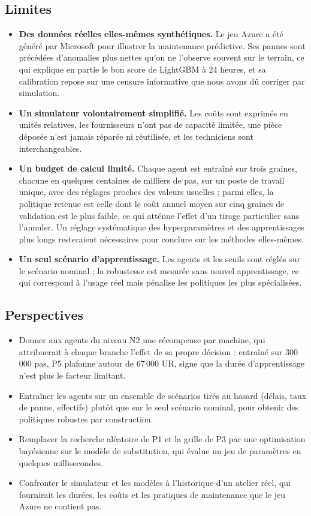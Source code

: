 \subsection{Limites}

\begin{itemize}
\item \textbf{Des données réelles elles-mêmes synthétiques.} Le jeu Azure a été généré par Microsoft pour illustrer la maintenance prédictive. Ses pannes sont précédées d'anomalies plus nettes qu'on ne l'observe souvent sur le terrain, ce qui explique en partie le bon score de LightGBM à 24 heures, et sa calibration repose sur une censure informative que nous avons dû corriger par simulation.
\item \textbf{Un simulateur volontairement simplifié.} Les coûts sont exprimés en unités relatives, les fournisseurs n'ont pas de capacité limitée, une pièce déposée n'est jamais réparée ni réutilisée, et les techniciens sont interchangeables.
\item \textbf{Un budget de calcul limité.} Chaque agent est entraîné sur trois graines, chacune en quelques centaines de milliers de pas, sur un poste de travail unique, avec des réglages proches des valeurs usuelles ; parmi elles, la politique retenue est celle dont le coût annuel moyen sur cinq graines de validation est le plus faible, ce qui atténue l'effet d'un tirage particulier sans l'annuler. Un réglage systématique des hyperparamètres et des apprentissages plus longs resteraient nécessaires pour conclure sur les méthodes elles-mêmes.
\item \textbf{Un seul scénario d'apprentissage.} Les agents et les seuils sont réglés sur le scénario nominal ; la robustesse est mesurée sans nouvel apprentissage, ce qui correspond à l'usage réel mais pénalise les politiques les plus spécialisées.
\end{itemize}

\subsection{Perspectives}

\begin{itemize}
\item Donner aux agents du niveau N2 une récompense par machine, qui attribuerait à chaque branche l'effet de sa propre décision : entraîné sur 300\,000 pas, P5 plafonne autour de 67\,000 UR, signe que la durée d'apprentissage n'est plus le facteur limitant.
\item Entraîner les agents sur un ensemble de scénarios tirés au hasard (délais, taux de panne, effectifs) plutôt que sur le seul scénario nominal, pour obtenir des politiques robustes par construction.
\item Remplacer la recherche aléatoire de P1 et la grille de P3 par une optimisation bayésienne sur le modèle de substitution, qui évalue un jeu de paramètres en quelques millisecondes.
\item Confronter le simulateur et les modèles à l'historique d'un atelier réel, qui fournirait les durées, les coûts et les pratiques de maintenance que le jeu Azure ne contient pas.
\end{itemize}
